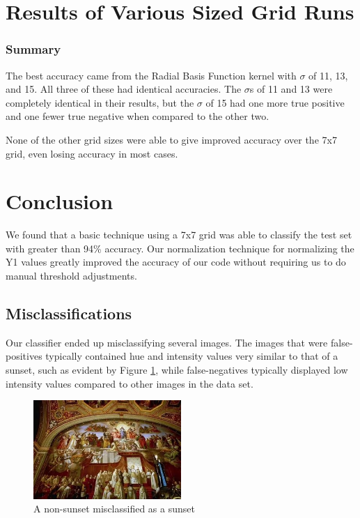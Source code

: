 \documentclass{article}
\begin{document}
\section{Results of Various Sized Grid Runs}


\subsubsection{Summary}
The best accuracy came from the Radial Basis Function kernel with \(\sigma\) of 11, 13, and 15.  All three of these had identical accuracies.  The \(\sigma\)s of 11 and 13 were completely identical in their results, but the \(\sigma\) of 15 had one more true positive and one fewer true negative when compared to the other two.

None of the other grid sizes were able to give improved accuracy over the 7x7 grid, even losing accuracy in most cases.

\section{Conclusion}
We found that a basic technique using a 7x7 grid was able to classify the test set with greater than 94\% accuracy. Our normalization technique for normalizing the Y1 values greatly improved the accuracy of our code without requiring us to do manual threshold adjustments.

\subsection{Misclassifications}
Our classifier ended up misclassifying several images. The images that were false-positives typically contained hue and intensity values very similar to that of a sunset, such as evident by Figure \ref{fig:fp-1}, while false-negatives typically displayed low intensity values compared to other images in the data set.  

\begin{figure}
\centering
\includegraphics[width=0.5\textwidth]{fp-1.png}
\caption{A non-sunset misclassified as a sunset}
\label{fig:fp-1}
\end{figure}
\end{document}
